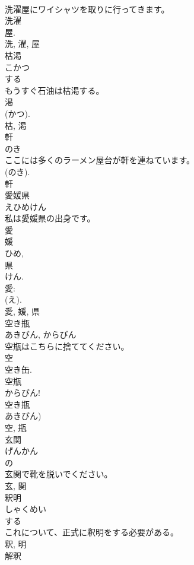 \documentclass[8pt]{extreport}
\begin{document}
\begin{CJK}{UTF8}{min}
\\	洗濯屋にワイシャツを取りに行ってきます。	
\\	洗濯 
\\	屋. 
\\	洗, 濯, 屋	
\\	枯渇	
\\	こかつ	
\\	する 
\\	もうすぐ石油は枯渇する。	
\\	渇 
\\	(かつ). 
\\	枯, 渇	
\\	軒	
\\	のき	
\\	ここには多くのラーメン屋台が軒を連ねています。	
\\	(のき). 
\\	軒	
\\	愛媛県	
\\	えひめけん	
\\	私は愛媛県の出身です。	
\\	愛 
\\	媛 
\\	ひめ, 
\\	県 
\\	けん. 
\\	愛: 
\\	(え). 
\\	愛, 媛, 県	
\\	空き瓶	
\\	あきびん, からびん	
\\	空瓶はこちらに捨ててください。	
\\	空 
\\	空き缶. 
\\	空瓶 
\\	からびん! 
\\	空き瓶 
\\	あきびん) 
\\	空, 瓶	
\\	玄関	
\\	げんかん	
\\	の 
\\	玄関で靴を脱いでください。	
\\	玄, 関	
\\	釈明	
\\	しゃくめい	
\\	する 
\\	これについて、正式に釈明をする必要がある。	
\\	釈, 明	
\\	解釈	

\end{CJK}
\end{document}
